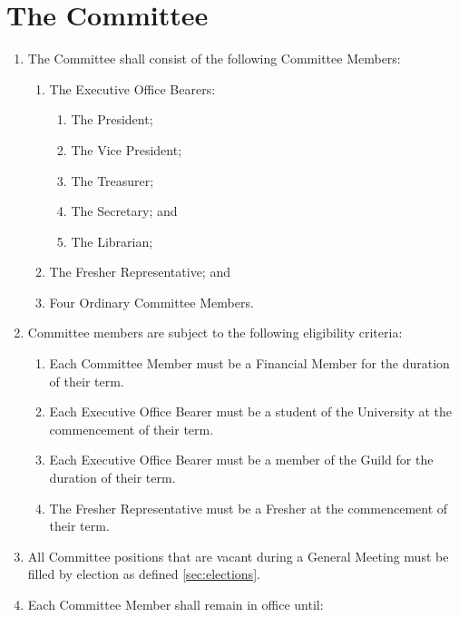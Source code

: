 \documentclass[a4paper]{article}
\begin{document}
\section{The Committee} \label{sec:committee}
\begin{enumerate}
    \item The Committee shall consist of the following Committee Members:
          \begin{enumerate}
              \item The Executive Office Bearers:
                    \begin{enumerate}
                        \item The President;
                        \item The Vice President;
                        \item The Treasurer;
                        \item The Secretary; and
                        \item The Librarian;
                    \end{enumerate}
              \item The Fresher Representative; and
              \item Four Ordinary Committee Members.
          \end{enumerate}
    \item Committee members are subject to the following eligibility criteria:
          \begin{enumerate}
              \item Each Committee Member must be a Financial Member for the duration of their term.
              \item \label{item:exec_is_student} Each Executive Office Bearer must be a student of the University at the commencement of their term.
              \item \label{item:exec_is_guild} Each Executive Office Bearer must be a member of the Guild for the duration of their term.
              \item \label{item:frep_is_fresh} The Fresher Representative must be a Fresher at the commencement of their term.
          \end{enumerate}
    \item All Committee positions that are vacant during a General Meeting must be filled by election as defined \cref{sec:elections}.
    \item Each Committee Member shall remain in office until:
          \begin{enumerate}

\end{enumerate}
\end{enumerate}
\end{document}
